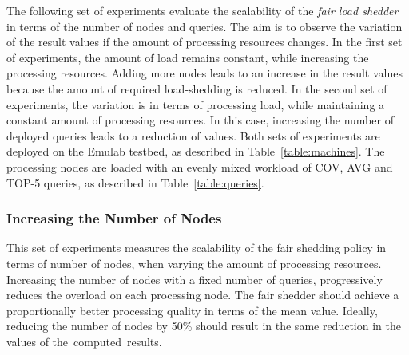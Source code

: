 The following set of experiments evaluate the scalability of the \emph{fair load shedder} in
terms of the number of nodes and queries. The aim is to observe the variation of the result \sic values
if the amount of processing resources changes. In the first set of experiments, the amount of load
remains constant, while increasing the processing resources.
Adding more nodes leads to an increase in the result \sic values because the amount of required
\mbox{load-shedding} is reduced. In the second set of experiments, the variation is in terms of
processing load, while maintaining a constant amount of processing resources. In this case, increasing
the number of deployed queries leads to a reduction of \sic values. 
Both sets of experiments are deployed on the Emulab testbed, as described in Table~\ref{table:machines}.
The processing nodes are loaded with an evenly mixed workload of
COV, AVG and TOP-5 queries, as described in Table~\ref{table:queries}.
\vspace{-10pt}
\subsubsection*{Increasing the Number of Nodes}

This set of experiments measures the scalability of the fair shedding policy in terms of
number of nodes, when varying the amount of processing
resources. Increasing the number of nodes with a fixed number of queries,
progressively reduces the overload on each processing node. The fair shedder should achieve a
proportionally better processing quality in terms of the mean \sic value. Ideally, reducing the number of
nodes by 50\% should result in the same reduction in the \sic values of the~computed~results.

